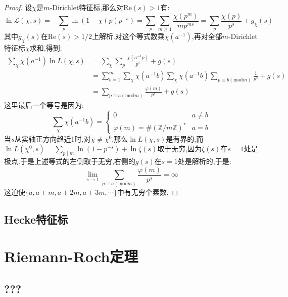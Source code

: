 \begin{enumerate}
\begin{proof}
    	设$\chi$是$m$-Dirichlet特征标,那么对$\mathrm{Re}(s)>1$有:
    	$$\ln\mathscr{L}(\chi,s)=-\sum_p\ln(1-\chi(p)p^{-s})=\sum_p\sum_{m\ge1}\frac{\chi(p^m)}{mp^{ms}}=\sum_p\frac{\chi(p)}{p^s}+g_{\chi}(s)$$
    	其中$g_{\chi}(s)$在$\mathrm{Re}(s)>1/2$上解析.对这个等式数乘$\chi(a^{-1})$,再对全部$m$-Dirichlet特征标$\chi$求和,得到:
    	\begin{align*}
    		\sum_{\chi}\chi(a^{-1})\ln L(\chi,s)&=\sum_{\chi}\sum_p\frac{\chi(a^{-1}p)}{p^s}+g(s)\\&=\sum_{b=1}^m\sum_{\chi}\chi(a^{-1}b)\sum_{\chi}\chi(a^{-1}b)\sum_{p\equiv b(\mathrm{mod}m)}\frac{1}{p^s}+g(s)\\&=\sum_{p\equiv a(\mathrm{mod}m)}\frac{\varphi(m)}{p^s}+g(s)
    	\end{align*}
    	这里最后一个等号是因为:
    	$$\sum_{\chi}\chi(a^{-1}b)=\left\{\begin{array}{cc}0&a\not=b\\\varphi(m)=\#(\mathbb{Z}/m\mathbb{Z})^*&a=b\end{array}\right.$$
    	当$s$从实轴正方向趋近1时,对$\chi\not=\chi^0$,那么$\ln L(\chi,s)$是有界的,而$\ln L(\chi^0,s)=\sum_{p\mid m}\ln(1-p^{-s})+\ln\zeta(s)$取于无穷,因为$\zeta(s)$在$s=1$处是极点.于是上述等式的左侧取于无穷,右侧的$g(s)$在$s=1$处是解析的,于是:
    	$$\lim\limits_{s\to1}\sum_{p\equiv a(\mathrm{mod}m)}\frac{\varphi(m)}{p^s}=\infty$$
    	这迫使$\{a,a\pm m,a\pm 2m,a\pm 3m,\cdots\}$中有无穷个素数.
    \end{proof}
\end{enumerate}
\subsection{Hecke特征标}
























\newpage
\section{Riemann-Roch定理}
\subsection{???}

